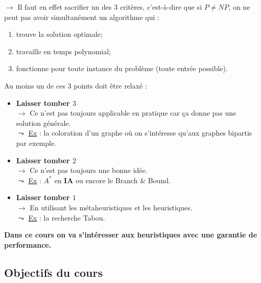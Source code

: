 \documentclass[12pt]{article}
\begin{document}
$\longrightarrow$ Il faut en effet sacrifier un des 3 critères, c'est-à-dire
que si $P \neq NP$, on ne peut pas avoir simultanément un algorithme qui :
\begin{enumerate}
\item trouve la solution optimale;
\item travaille en temps polynomial;
\item fonctionne pour toute instance du problème (toute entrée possible). \\
\end{enumerate}

\noindent Au moins un de ces 3 points doit être relaxé :
\begin{itemize}
\item \textbf{Laisser tomber $3$}\\
$\rightarrow$ Ce n'est pas toujours applicable en pratique car ça donne pas une
solution générale.\\
$\leadsto$ \underline{Ex} : la coloration d'un graphe où on s'intéresse qu'aux
graphes bipartis par exemple.
\item \textbf{Laisser tomber $2$}\\
$\rightarrow$ Ce n'est pas toujours une bonne idée.\\
$\leadsto$ \underline{Ex} : $A^*$ en \textbf{IA} ou encore le Branch \& Bound.
\item \textbf{Laisser tomber $1$}\\
$\rightarrow$ En utilisant les métaheuristiques et les heuristiques.\\
$\leadsto$ \underline{Ex} : la recherche Tabou.\\
\end{itemize}

\textbf{Dans ce cours on va s'intéresser aux heuristiques avec une garantie de
performance.}

\subsection{Objectifs du cours}
\end{document}
